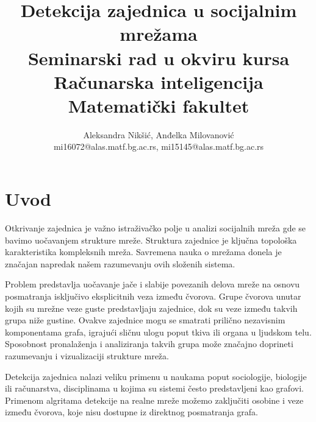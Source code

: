 \documentclass[a4paper]{article}
\begin{document}
\title{Detekcija zajednica u socijalnim mrežama\\ \small{Seminarski rad u okviru kursa\\Računarska inteligencija\\ Matematički fakultet}}

\author{Aleksandra Nikšić, Anđelka Milovanović\\ mi16072@alas.matf.bg.ac.rs, mi15145@alas.matf.bg.ac.rs}


\maketitle


\tableofcontents

\newpage

\section{Uvod}
\label{sec:uvod}
Otkrivanje zajednica \cite{fortunato2010community} je važno istraživačko polje u analizi socijalnih mreža gde se bavimo uočavanjem strukture mreže. Struktura zajednice je ključna topološka karakteristika kompleksnih mreža. Savremena nauka o mrežama donela je značajan napredak našem razumevanju ovih složenih sistema.

Problem predstavlja uočavanje jače i slabije povezanih delova mreže na osnovu posmatranja isključivo eksplicitnih veza između čvorova. Grupe čvorova unutar kojih su mrežne veze guste predstavljaju zajednice, dok su veze između takvih grupa niže gustine. Ovakve zajednice mogu se smatrati prilično nezavisnim komponentama grafa, igrajući sličnu ulogu poput tkiva ili organa u ljudskom telu. Sposobnost pronalaženja i analiziranja takvih grupa može značajno doprineti razumevanju i vizualizaciji strukture mreža.

Detekcija zajednica nalazi veliku primenu u naukama poput sociologije, biologije ili računarstva, disciplinama u kojima su sistemi često predstavljeni kao grafovi. Primenom algritama detekcije na realne mreže možemo zaključiti osobine i veze između čvorova, koje nisu dostupne iz direktnog posmatranja grafa. 
\end{document}
